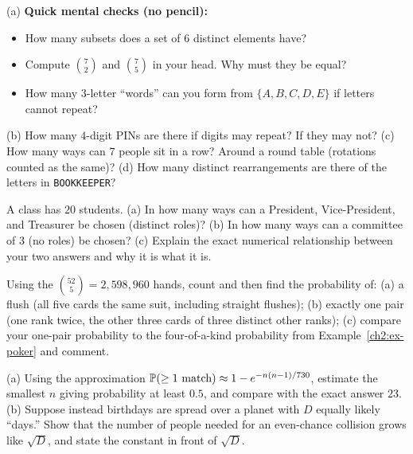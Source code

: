 \begin{exercise}
\label{ch2:exr-warmup}
(a) \textbf{Quick mental checks (no pencil):}
    \begin{itemize}[leftmargin=1.5em]
      \item How many subsets does a set of $6$ distinct elements have?
      \item Compute $\binom{7}{2}$ and $\binom{7}{5}$ in your head. Why must they be equal?
      \item How many $3$-letter ``words'' can you form from $\{A, B, C, D, E\}$ if letters cannot repeat?
    \end{itemize}
(b) How many $4$-digit PINs are there if digits may repeat? If they may not?
(c) How many ways can $7$ people sit in a row? Around a round table (rotations counted as
the same)?
(d) How many distinct rearrangements are there of the letters in \texttt{BOOKKEEPER}?
\end{exercise}

\begin{exercise}
\label{ch2:exr-order}
A class has $20$ students. (a) In how many ways can a President, Vice-President, and
Treasurer be chosen (distinct roles)? (b) In how many ways can a committee of $3$
(no roles) be chosen? (c) Explain the exact numerical relationship between your two answers
and why it is what it is.
\end{exercise}

\begin{exercise}
\label{ch2:exr-poker}
Using the $\binom{52}{5} = 2{,}598{,}960$ hands, count and then find the probability of:
(a) a flush (all five cards the same suit, including straight flushes);
(b) exactly one pair (one rank twice, the other three cards of three distinct other ranks);
(c) compare your one-pair probability to the four-of-a-kind probability from
Example~\ref{ch2:ex-poker} and comment.
\end{exercise}

\begin{exercise}
\label{ch2:exr-birthday}
(a) Using the approximation $\P(\ge 1\text{ match}) \approx 1 - e^{-n(n-1)/730}$, estimate
the smallest $n$ giving probability at least $0.5$, and compare with the exact answer $23$.
(b) Suppose instead birthdays are spread over a planet with $D$ equally likely ``days.''
Show that the number of people needed for an even-chance collision grows like
$\sqrt{D}$, and state the constant in front of $\sqrt{D}$.
\end{exercise}

